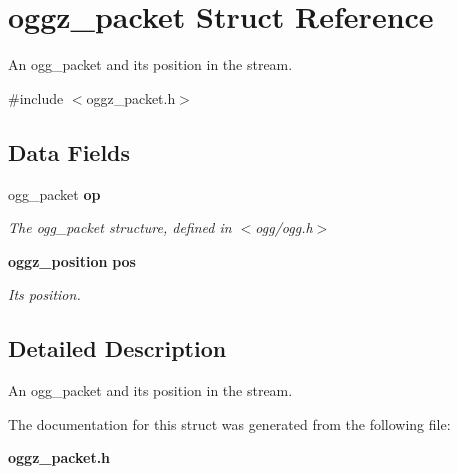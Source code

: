 \section{oggz\_\-packet Struct Reference}
\label{structoggz__packet}


An ogg\_\-packet and its position in the stream.  




{\ttfamily \#include $<$oggz\_\-packet.h$>$}

\subsection*{Data Fields}
\begin{DoxyCompactItemize}
\item 
ogg\_\-packet {\bf op}\label{structoggz__packet_a36cb056219e68a383e7139ce0a2ff715}

\begin{DoxyCompactList}\small\item\em The ogg\_\-packet structure, defined in $<$ogg/ogg.h$>$ \item\end{DoxyCompactList}\item 
{\bf oggz\_\-position} {\bf pos}\label{structoggz__packet_a71d24b8fa94acf2511c0c6f7b24de546}

\begin{DoxyCompactList}\small\item\em Its position. \item\end{DoxyCompactList}\end{DoxyCompactItemize}


\subsection{Detailed Description}
An ogg\_\-packet and its position in the stream. 

The documentation for this struct was generated from the following file:\begin{DoxyCompactItemize}
\item 
{\bf oggz\_\-packet.h}\end{DoxyCompactItemize}
